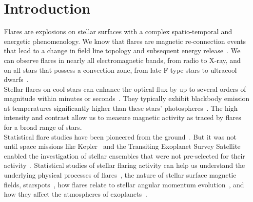 \documentclass{aa}
\begin{document}
\section{Introduction}
Flares are explosions on stellar surfaces with a complex spatio-temporal and energetic phenomenology. We know that flares are magnetic re-connection events that lead to a change in field line topology and subsequent energy release~\citep{priest_magnetic_2002}. We can observe flares in nearly all electromagnetic bands, from radio
to X-ray, and on all stars that possess a convection zone, from late F type stars to ultracool dwarfs~\citep{schaefer2000,benz2010,gizis2013}. 
\\
Stellar flares on cool stars can enhance the optical flux by up to several orders of magnitude within minutes or seconds~\citep{haisch1991}. They typically exhibit blackbody emission at temperatures significantly higher than these stars' photospheres~\citep{hawley1992}. The high intensity and contrast allow us to measure magnetic activity as traced by flares for a broad range of stars.
\\
Statistical flare studies have been pioneered from the ground~\citep{lacy_uv_1976}. But it was not until space missions like Kepler~\citep{koch2010} and the Transiting Exoplanet Survey Satellite~\citep{ricker2014} enabled the investigation of stellar ensembles that were not pre-selected for their activity~\citep{walkowicz2011}. Statistical studies of stellar flaring activity can help us understand the underlying physical processes of flares~\citep{benz2010}, the nature of stellar surface magnetic fields, starspots~\citep{davenport_flaresandspots_2015, howard_evryflare2arxiv_2019}, how flares relate to stellar angular momentum evolution~\citep{mondrik2019, howard_evryflare2arxiv_2019}, and how they affect the atmospheres of exoplanets~\citep{lecavelier_flareescape_2012, loyd_mflaresplanetsfuv_2018, tilley_repeated_flare_2019, howard2019}.%
\end{document}
